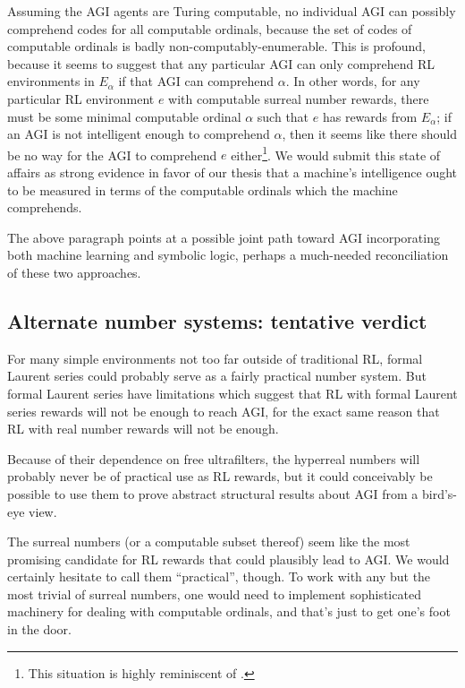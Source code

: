 \documentclass[reqno]{article}
\theoremstyle{definition}
\begin{document}
Assuming the AGI agents are Turing computable,
no individual AGI can possibly comprehend codes for all computable ordinals, because
the set of codes of computable ordinals is badly non-computably-enumerable.
This is profound, because it seems to suggest that any particular AGI can
only comprehend RL environments in $E_\alpha$ if that AGI can comprehend $\alpha$.
In other words, for any particular RL environment $e$ with computable surreal number
rewards, there must be some minimal computable ordinal $\alpha$ such that $e$ has
rewards from $E_\alpha$; if an AGI is not intelligent enough to comprehend $\alpha$,
then it seems like there should be no way for the AGI to comprehend $e$
either\footnote{This situation is highly reminiscent of \cite{hibbard2011measuring}.}.
We would submit
this state of affairs as strong evidence in favor of our thesis
\cite{alexander2019measuring} that a machine's intelligence ought to be measured
in terms of the computable ordinals which the machine comprehends.

The above paragraph points at a possible joint path
toward AGI incorporating both machine learning and symbolic logic, perhaps
a much-needed reconciliation of these two approaches.

\subsection{Alternate number systems: tentative verdict}

For many simple environments not too far outside of traditional RL,
formal Laurent series could probably serve as a fairly practical number system.
But formal Laurent series have limitations which suggest that RL
with formal Laurent series rewards will not be enough to reach AGI, for the exact
same reason that RL with real number rewards will not be enough.

Because of their dependence on free ultrafilters, the hyperreal numbers will
probably never be of practical use as RL rewards, but it could conceivably be
possible to use them to prove abstract structural results about AGI from a
bird's-eye view.

The surreal numbers (or a computable subset thereof) seem like the most promising
candidate for RL rewards that could plausibly lead to AGI. We would certainly
hesitate to call them ``practical'', though. To work with any but the most trivial
of surreal numbers, one would need to implement sophisticated machinery for
dealing with computable ordinals, and that's just to get one's foot in the door.
\end{document}
